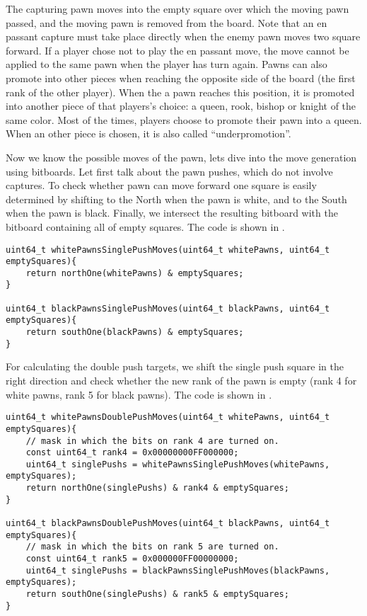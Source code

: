 The capturing pawn moves into the empty square over which the moving pawn passed, and the moving pawn is removed from the board.
Note that an en passant capture must take place directly when the enemy pawn moves two square forward. 
If a player chose not to play the en passant move, the move cannot be applied to the same pawn when the player has turn again.
Pawns can also promote into other pieces when reaching the opposite side of the board (the first rank of the other player).
When the a pawn reaches this position, it is promoted into another piece of that players's choice: a queen, rook, bishop or knight of the same color. 
Most of the times, players choose to promote their pawn into a queen.
When an other piece is chosen, it is also called ``underpromotion''.

Now we know the possible moves of the pawn, lets dive into the move generation using bitboards.
Let first talk about the pawn pushes, which do not involve captures.
To check whether pawn can move forward one square is easily determined by shifting to the North when the pawn is white, and to the South when the pawn is black. Finally, we intersect the resulting bitboard with the bitboard containing all of empty squares. The code is shown in .
%
\begin{listing}
\begin{verbatim}
uint64_t whitePawnsSinglePushMoves(uint64_t whitePawns, uint64_t emptySquares){
	return northOne(whitePawns) & emptySquares;
}

uint64_t blackPawnsSinglePushMoves(uint64_t blackPawns, uint64_t emptySquares){
	return southOne(blackPawns) & emptySquares;
}
\end{verbatim}
\label{fig: pawn single push}
\end{listing}
%
For calculating the double push targets, we shift the single push square in the right direction and check whether the new rank of the pawn is empty (rank 4 for white pawns, rank 5 for black pawns). The code is shown in .
%
\begin{listing}
\begin{verbatim}
uint64_t whitePawnsDoublePushMoves(uint64_t whitePawns, uint64_t emptySquares){
	// mask in which the bits on rank 4 are turned on.
	const uint64_t rank4 = 0x00000000FF000000;
	uint64_t singlePushs = whitePawnsSinglePushMoves(whitePawns, emptySquares);
	return northOne(singlePushs) & rank4 & emptySquares;
}

uint64_t blackPawnsDoublePushMoves(uint64_t blackPawns, uint64_t emptySquares){
	// mask in which the bits on rank 5 are turned on.
	const uint64_t rank5 = 0x000000FF00000000;
	uint64_t singlePushs = blackPawnsSinglePushMoves(blackPawns, emptySquares);
	return southOne(singlePushs) & rank5 & emptySquares;
}
\end{verbatim}
\label{fig: pawns double push}
\end{listing}
